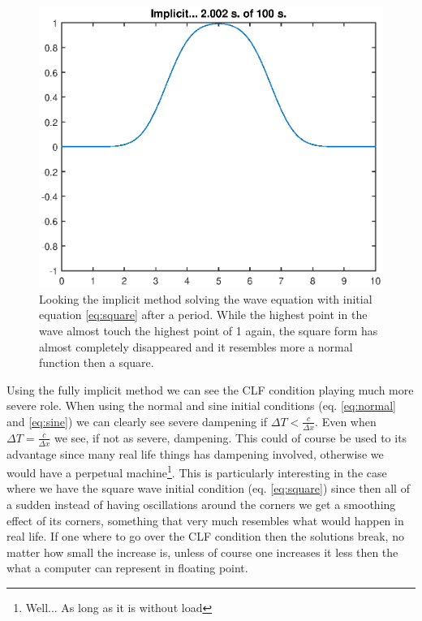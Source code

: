 \documentclass[11pt]{article}
\begin{document}
\begin{figure}[H]
	\centering
	\includegraphics[width=1\textwidth]{../implicitSquare}
	\caption{Looking the implicit method solving the wave equation with initial equation 
	\ref{eq:square} after a period. While the highest point in the wave almost touch the highest point of 1 again, the square form has almost completely disappeared and it resembles more a normal function then a square.}
	\label{fig:implicitSquare}
\end{figure}

Using the fully implicit method we can see the CLF condition playing much more severe role. When using the normal and sine initial conditions (eq. \ref{eq:normal} and \ref{eq:sine}) we can clearly see severe dampening if $\Delta T < \frac{c}{\Delta x}$. Even when $\Delta T = \frac{c}{\Delta x}$ we see, if not as severe, dampening. This could of course be used to its advantage since many real life things has dampening involved, otherwise we would have a perpetual machine\footnote{Well... As long as it is without load}. This is particularly interesting in the case where we have the square wave initial condition (eq. \ref{eq:square}) since then all of a sudden instead of having oscillations around the corners we get a smoothing effect of its corners, something that very much resembles what would happen in real life. If one where to go over the CLF condition then the solutions break, no matter how small the increase is, unless of course one increases it less then the what a computer can represent in floating point. 
\end{document}
